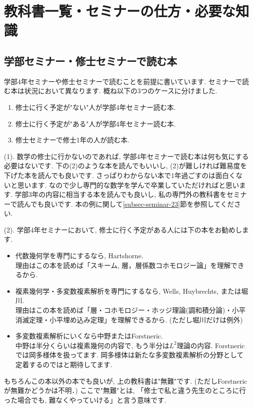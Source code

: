 
\section{教科書一覧・セミナーの仕方・必要な知識}
\label{sec-2}

\subsection{学部セミナー・修士セミナーで読む本}
学部4年セミナーや修士セミナーで読むことを前提に書いています.
セミナーで読む本は状況において異なります. 概ね以下の3つのケースに分けました. 
\begin{enumerate}[label=$(\arabic*)$]
  \setlength{\parskip}{0cm} %
  \setlength{\itemsep}{0cm} %
 \item 修士に行く予定が"ない"人が学部4年セミナー読む本.
\item 修士に行く予定が"ある"人が学部4年セミナー読む本.
\item 修士セミナーで修士1年の人が読む本.
\end{enumerate}

(1). 数学の修士に行かないのであれば, 学部4年セミナーで読む本は何も気にする必要はないです. 
下の(2)のような本を読んでもいいし,  (2)が難しければ難易度を下げた本を読んでも良いです. 
さっぱりわからない本で1年過ごすのは面白くないと思います. なので少し専門的な数学を学んで卒業していただければと思います. 
学部3年の内容に相当する本を読んでも良いし, 私の専門外の教科書をセミナーで読んでも良いです. 本の例に関して\ref{subsec-seminar-23}節を参照してください. 

(2). 学部4年セミナーにおいて, 修士に行く予定がある人には下の本をお勧めします.

\begin{tcolorbox}[mybox]
\begin{itemize}[left=0pt]
  \setlength{\parskip}{0cm} %
  \setlength{\itemsep}{8pt} %
\item 代数幾何学を専門にするなら, Hartshorne. \\
理由はこの本を読めば「スキーム, 層，層係数コホモロジー論」を理解できるから.
\item 複素幾何学・多変数複素解析を専門にするなら, Wells, Huybrechts, または堀川. \\ 
理由はこの本を読めば「層・コホモロジー・ホッジ理論(調和積分論)・小平消滅定理・小平埋め込み定理」を理解できるから. (ただし堀川だけは例外)
\item 多変数複素解析にいくなら中野またはForstneric. \\
中野は半分くらいは複素幾何の内容で, もう半分は$L^2$理論の内容. 
Forstnericでは岡多様体を扱ってます. 岡多様体は新たな多変数複素解析の分野として定着するのではと期待してます. 
\end{itemize}
\end{tcolorbox}
もちろんこの本以外の本でも良いが, 上の教科書は"無難"です. (ただしForstnericが無難かどうかは不明．)
ここで"無難"とは, 「修士で私と違う先生のところに行った場合でも, 難なくやっていける」と言う意味です. 

